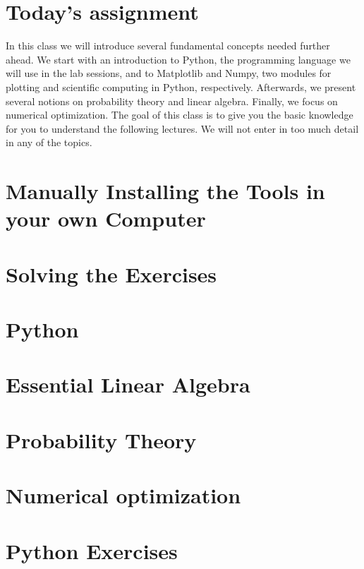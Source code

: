 
\section{Today's assignment}

In this class we will introduce several fundamental concepts needed further
ahead. We start with an introduction to Python, the programming language we
will use in the lab sessions, and to Matplotlib and Numpy, two modules for
plotting and scientific computing in Python, respectively. Afterwards, we
present several notions on probability theory and linear algebra. Finally, we
focus on numerical optimization. The goal of this class is to give you the
basic knowledge for you to understand the following lectures. We will not enter
in too much detail in any of the topics.  

\section{Manually Installing the Tools in your own Computer}


\section{Solving the Exercises}
\label{sec:SolvingExercises}


\section{Python}
\label{sec:Python}


\section{Essential Linear Algebra}


\section{Probability Theory}


\section{Numerical optimization\label{numerical_optimization}}


\section{Python Exercises}

